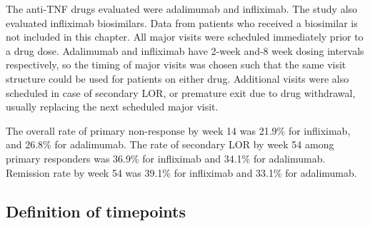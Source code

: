 \begin{outline}
The anti-\gls{TNF} drugs evaluated were adalimumab and infliximab.
The study also evaluated infliximab biosimilars. 
Data from patients who received a biosimilar is not included in this chapter.
All major visits were scheduled immediately prior to a drug dose.
Adalimumab and infliximab have 2-week and-8 week dosing intervals respectively, so the timing of major visits was chosen such that the same visit structure could be used for patients on either drug.
Additional visits were also scheduled in case of secondary \gls{LOR}, or premature exit due to drug withdrawal, usually replacing the next scheduled major visit.

The overall rate of primary non-response by week 14 was 21.9\% for infliximab, and 26.8\% for adalimumab.
The rate of secondary \gls{LOR} by week 54 among primary responders was 36.9\% for infliximab and 34.1\% for adalimumab.
Remission rate by week 54 was 39.1\% for infliximab and 33.1\% for adalimumab.

\subsection{Definition of timepoints}
\label{subsubsec:multiPANTS_timepoints_def}


\end{outline}

